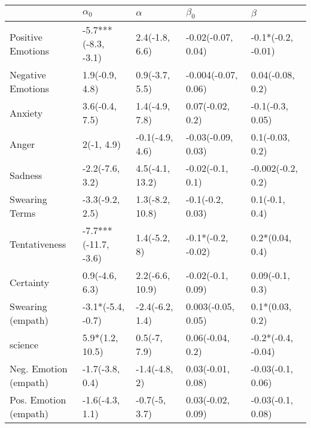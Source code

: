 \begin{tabular}{lllll}
\toprule
{} &            $\alpha_0$ &         $\alpha$ &            $\beta_0$ &             $\beta$ \\
\midrule
Positive Emotions     &   -5.7***(-8.3, -3.1) &   2.4(-1.8, 6.6) &   -0.02(-0.07, 0.04) &  -0.1*(-0.2, -0.01) \\
Negative Emotions     &        1.9(-0.9, 4.8) &   0.9(-3.7, 5.5) &  -0.004(-0.07, 0.06) &    0.04(-0.08, 0.2) \\
Anxiety               &        3.6(-0.4, 7.5) &   1.4(-4.9, 7.8) &     0.07(-0.02, 0.2) &    -0.1(-0.3, 0.05) \\
Anger                 &            2(-1, 4.9) &  -0.1(-4.9, 4.6) &   -0.03(-0.09, 0.03) &     0.1(-0.03, 0.2) \\
Sadness               &       -2.2(-7.6, 3.2) &  4.5(-4.1, 13.2) &     -0.02(-0.1, 0.1) &   -0.002(-0.2, 0.2) \\
Swearing Terms        &       -3.3(-9.2, 2.5) &  1.3(-8.2, 10.8) &     -0.1(-0.2, 0.03) &      0.1(-0.1, 0.4) \\
Tentativeness         &  -7.7***(-11.7, -3.6) &     1.4(-5.2, 8) &   -0.1*(-0.2, -0.02) &     0.2*(0.04, 0.4) \\
Certainty             &        0.9(-4.6, 6.3) &  2.2(-6.6, 10.9) &    -0.02(-0.1, 0.09) &     0.09(-0.1, 0.3) \\
Swearing (empath)     &     -3.1*(-5.4, -0.7) &  -2.4(-6.2, 1.4) &   0.003(-0.05, 0.05) &     0.1*(0.03, 0.2) \\
science               &       5.9*(1.2, 10.5) &     0.5(-7, 7.9) &     0.06(-0.04, 0.2) &  -0.2*(-0.4, -0.04) \\
Neg. Emotion (empath) &       -1.7(-3.8, 0.4) &    -1.4(-4.8, 2) &    0.03(-0.01, 0.08) &   -0.03(-0.1, 0.06) \\
Pos. Emotion (empath) &       -1.6(-4.3, 1.1) &    -0.7(-5, 3.7) &    0.03(-0.02, 0.09) &   -0.03(-0.1, 0.08) \\
\bottomrule
\end{tabular}
